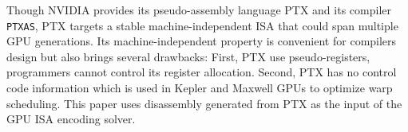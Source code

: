 Though NVIDIA provides its pseudo-assembly language PTX and its compiler {\tt PTXAS}, PTX targets a stable machine-independent ISA that could span multiple GPU generations.
Its machine-independent property is convenient for compilers design but also brings several drawbacks:
First, PTX use pseudo-registers, programmers cannot control its register allocation. 
Second, PTX has no control code information which is used in Kepler and Maxwell GPUs to optimize warp scheduling.
This paper uses disassembly generated from PTX as the input of the GPU ISA encoding solver.
